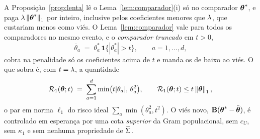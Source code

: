 \documentclass[11pt,a4paper]{article}
\newcommand{\Bmat}{\mathbf{B}}
\newcommand{\thbar}{\bar{\btheta}}
\begin{document}
A Proposição~\ref{prop:lenta} lê o Lema~\ref{lem:comparador}(i) só no
comparador $\boldsymbol{\theta}^{*}$, e paga $\lambda\left\lVert \boldsymbol{\theta}^{*} \right\rVert_{1}$ por inteiro,
inclusive pelos coeficientes menores que $\lambda$, que custariam menos como
viés. O Lema~\ref{lem:comparador} vale para todos os comparadores no mesmo
evento, e o \emph{comparador truncado} em $t > 0$,
\begin{equation}
  \label{eq:truncado}
  \bar\theta_{a} \;=\; \theta^{*}_{a}\,\mathbf{1}\{|\theta^{*}_{a}| > t\},
  \qquad a = 1,\dots,d,
\end{equation}
cobra na penalidade só os coeficientes acima de $t$ e manda os de baixo ao
viés. O que sobra é, com $t = \lambda$, a quantidade
\begin{equation}
  \label{eq:R1}
  \mathcal{R}_{1}(\boldsymbol{\theta};t) \;=\; \sum_{a=1}^{d}\min\bigl(t|\theta_{a}|,\,\theta_{a}^{2}\bigr),
  \qquad
  \mathcal{R}_{1}(\boldsymbol{\theta};t) \le t\left\lVert \boldsymbol{\theta} \right\rVert_{1},
\end{equation}
o par em norma $\ell_{1}$ do risco ideal $\sum_{a}\min(\theta_{a}^{2},t^{2})$.
O viés novo, $\Bmat(\thetastar - \thbar)$, é controlado em esperança por uma
cota \emph{superior} da Gram populacional, sem $c_{U}$, sem $\kappa_{1}$ e sem
nenhuma propriedade de $\widehat{\Sigma}$.
\end{document}
